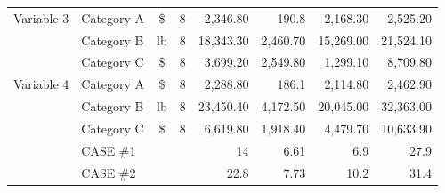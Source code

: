 \documentclass[11pt]{article}
\begin{document}
\begin{table}[H]
{\begin{tabular}{rlrrrrrr}
            \multicolumn{1}{l}{Variable 3}         & Category A                              & \multicolumn{1}{c}{\$}            & \multicolumn{1}{c}{8}            & 2,346.80                          & 190.8                                 & 2,168.30                         & 2,525.20                         \\
                                                   & Category B                              & \multicolumn{1}{c}{lb}            & \multicolumn{1}{c}{8}            & 18,343.30                         & 2,460.70                              & 15,269.00                        & 21,524.10                        \\
                                                   & Category C                              & \multicolumn{1}{c}{\$}            & \multicolumn{1}{c}{8}            & 3,699.20                          & 2,549.80                              & 1,299.10                         & 8,709.80                         \\
            \multicolumn{1}{l}{Variable 4}         & Category A                              & \multicolumn{1}{c}{\$}            & \multicolumn{1}{c}{8}            & 2,288.80                          & 186.1                                 & 2,114.80                         & 2,462.90                         \\
                                                   & Category B                              & \multicolumn{1}{c}{lb}            & \multicolumn{1}{c}{8}            & 23,450.40                         & 4,172.50                              & 20,045.00                        & 32,363.00                        \\
                                                   & Category C                              & \multicolumn{1}{c}{\$}            & \multicolumn{1}{c}{8}            & 6,619.80                          & 1,918.40                              & 4,479.70                         & 10,633.90                        \\
            \hline
                                                   & CASE \#1                                &                                   &                                  & 14                                & 6.61                                  & 6.9                              & 27.9                             \\
                                                   & CASE \#2                                &                                   &                                  & 22.8                              & 7.73                                  & 10.2                             & 31.4                             \\
            \hline
        \end{tabular}}
\end{table}%
\end{document}
